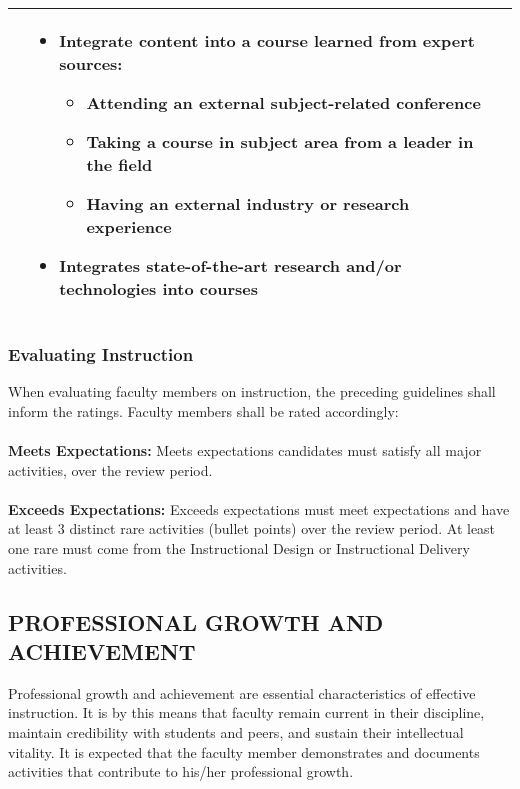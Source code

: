 \documentclass{article}
\begin{document}
\begin{longtable}{p{2cm}p{6cm}P{6cm}}
\begin{itemize}[noitemsep,leftmargin=*,topsep=0pt,partopsep=0pt]
    \end{itemize}
  & %
    \begin{itemize}[noitemsep,leftmargin=*,topsep=0pt,partopsep=0pt]
        \item Integrate content into a course learned from expert sources:
        		\begin{itemize}
		\item Attending an external  subject-related
 conference
 		\item Taking a course in subject area from a leader in the field
		\item Having an external industry or research experience
		\end{itemize}
        \item Integrates state-of-the-art research and/or technologies into courses
     \end{itemize}\\ 
\hline
\end{longtable}

\subsubsection{Evaluating Instruction}

When evaluating faculty members on instruction, the preceding guidelines shall inform the ratings. Faculty members shall be rated accordingly:
\\\\
\textbf{Meets Expectations:} Meets expectations candidates must satisfy all major activities, over the review period.
\\\\
\textbf{Exceeds Expectations:} Exceeds expectations must meet expectations and have at least 3 distinct rare activities (bullet points) over the review period. At least one rare must come from the Instructional Design or Instructional Delivery activities.

\subsection{PROFESSIONAL GROWTH AND ACHIEVEMENT}

Professional growth and achievement are essential characteristics of effective instruction. It is by this means that faculty remain current in their discipline, maintain credibility with students and peers, and sustain their intellectual vitality. It is expected that the faculty member demonstrates and documents activities that contribute to his/her professional growth.
\end{document}
